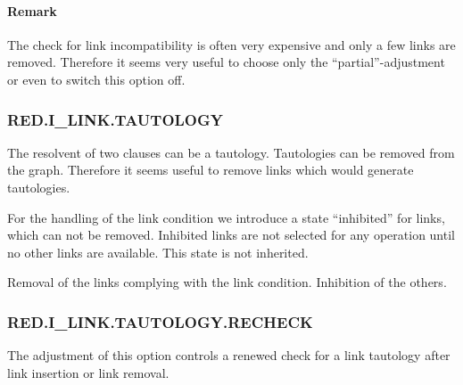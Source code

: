 \PO
{}

\paragraph{Remark} 
The check for link incompatibility is often very expensive and only a
few links are removed. Therefore it seems very useful to choose only
the ``partial''-adjustment or even to switch this option off.



\subsubsection{RED.I\_LINK.TAUTOLOGY}
  

The resolvent of two clauses can be a tautology. Tautologies can be 
removed from the graph. Therefore it seems useful to remove links which 
would generate tautologies.

For the handling of the link condition we introduce a state ``inhibited''
for links, which can not be removed. Inhibited links are not selected for
any operation until no other links are available. This state is not inherited.

\PO
{}
%
{Removal of the links complying with the link condition.
Inhibition of the others.}

\subsubsection{RED.I\_LINK.TAUTOLOGY.RECHECK}
  

The adjustment of this option controls a renewed check for a link
tautology after link insertion or link removal.

\PO
{}


